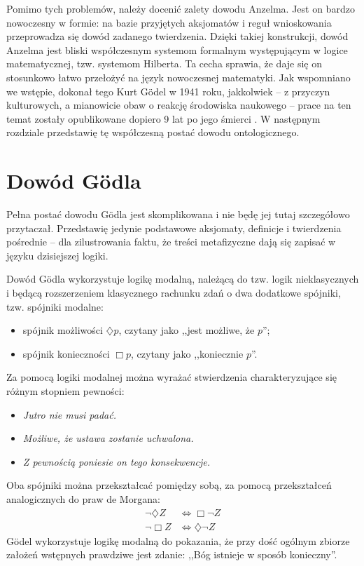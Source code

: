 \documentclass[
	runningheads
]{llncs}
\begin{document}
Pomimo tych problemów, należy docenić zalety dowodu Anzelma. Jest on bardzo nowoczesny w formie: na bazie przyjętych aksjomatów i reguł wnioskowania przeprowadza się dowód zadanego twierdzenia. Dzięki takiej konstrukcji, dowód Anzelma jest bliski współczesnym systemom formalnym występującym w logice matematycznej, tzw. systemom Hilberta. Ta cecha sprawia, że daje się on stosunkowo łatwo przełożyć na język nowoczesnej matematyki. Jak wspomniano we wstępie, dokonał tego Kurt G\"odel w 1941 roku, jakkolwiek -- z przyczyn kulturowych, a mianowicie obaw o reakcję środowiska naukowego -- prace na ten temat zostały opublikowane dopiero 9 lat po jego śmierci \cite{goedel1995}. W następnym rozdziale przedstawię tę współczesną postać dowodu ontologicznego. 

\section{Dowód G\"odla} \label{sec:dowod-godla}
Pełna postać dowodu G\"odla jest skomplikowana i nie będę jej tutaj szczegółowo przytaczał. Przedstawię jedynie podstawowe aksjomaty, definicje i twierdzenia pośrednie -- dla zilustrowania faktu, że treści metafizyczne dają się zapisać w języku dzisiejszej logiki. 

Dowód G\"odla wykorzystuje logikę modalną, należącą do tzw. logik nieklasycznych i będącą rozszerzeniem klasycznego rachunku zdań o dwa dodatkowe spójniki, tzw. spójniki modalne: 
\begin{itemize}
	\item spójnik możliwości $\diamondsuit p$, czytany jako ,,jest możliwe, że $p$'';
	\item spójnik konieczności $\Box p$, czytany jako ,,koniecznie $p$''.
\end{itemize} 
Za pomocą logiki modalnej można wyrażać stwierdzenia charakteryzujące się różnym stopniem pewności: 
\begin{itemize}
	\item \emph{Jutro nie musi padać.}
	\item \emph{Możliwe, że ustawa zostanie uchwalona.}
	\item \emph{Z pewnością poniesie on tego konsekwencje.}
\end{itemize}
Oba spójniki można przekształcać pomiędzy sobą, za pomocą przekształceń analogicznych do praw de Morgana:
\begin{align*}
\neg \diamondsuit Z & \Leftrightarrow \Box \neg Z \\ 
\neg \Box Z & \Leftrightarrow \diamondsuit \neg Z
\end{align*}
G\"odel wykorzystuje logikę modalną do pokazania, że przy dość ogólnym zbiorze założeń wstępnych prawdziwe jest zdanie: ,,Bóg istnieje w sposób konieczny''. 
\end{document}
